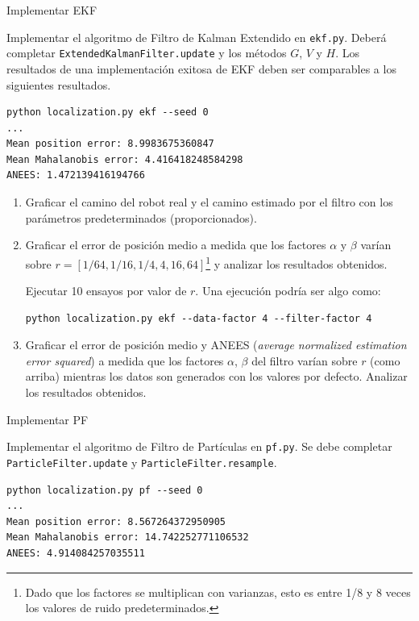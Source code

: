 \documentclass[tp]{lcc}
\begin{document}
	\ejercicio Implementar EKF
    
	Implementar el algoritmo de Filtro de Kalman Extendido en \lstinline[style=bash]{ekf.py}. Deberá completar \lstinline[style=bash]{ExtendedKalmanFilter.update} y los métodos $G$, $V$ y $H$. Los resultados de una implementación exitosa de EKF deben ser comparables a los siguientes resultados.

\begin{lstlisting}[style=bash] 
python localization.py ekf --seed 0
...
Mean position error: 8.9983675360847
Mean Mahalanobis error: 4.416418248584298
ANEES: 1.472139416194766
\end{lstlisting}


	\begin{enumerate}
		\item Graficar el camino del robot real y el camino estimado por el filtro con los parámetros predeterminados (proporcionados).
		\item  Graficar el error de posición medio a medida que los factores $\alpha$ y $\beta$ varían sobre $r = [1/64, 1/16, 1/4, 4, 16, 64]$\footnote{Dado que los factores se multiplican con varianzas, esto es entre 1/8 y 8 veces los valores de ruido predeterminados.} y analizar los resultados obtenidos.
		
		Ejecutar 10 ensayos por valor de $r$. Una ejecución podría ser algo como:

\begin{lstlisting}[style=bash] 
python localization.py ekf --data-factor 4 --filter-factor 4
\end{lstlisting}

		\item Graficar el error de posición medio y ANEES (\emph{average normalized estimation error squared}) a medida que los factores $\alpha$, $\beta$ del filtro varían sobre $r$ (como arriba) mientras los datos son generados con los valores por defecto. Analizar los resultados obtenidos.
	\end{enumerate}


	\ejercicio Implementar PF
	
	Implementar el algoritmo de Filtro de Partículas en \lstinline[style=bash]{pf.py}. Se debe completar \lstinline[style=bash]{ParticleFilter.update} y \lstinline[style=bash]{ParticleFilter.resample}.

\begin{lstlisting}[style=bash] 
python localization.py pf --seed 0
...
Mean position error: 8.567264372950905
Mean Mahalanobis error: 14.742252771106532
ANEES: 4.914084257035511
\end{lstlisting}
\end{document}
